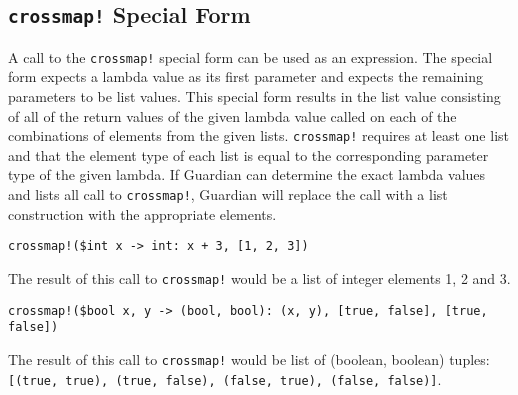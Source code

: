 
\subsection{\texttt{crossmap!} Special Form}
{
	A call to the \texttt{crossmap!} special form can be used as an expression.
	The special form expects a lambda value as its
	first parameter and expects the remaining parameters to be list values.
	This special form results in the list value consisting
	of all of the return values of the given lambda value called on each of
	the combinations of elements from the given lists.
	\texttt{crossmap!} requires at least one list and that
	the element type of each list is equal to the corresponding parameter type
	of the given lambda.
	If Guardian can determine the exact lambda values and lists all call to
	\texttt{crossmap!}, Guardian will replace the call with a list
	construction with the appropriate elements.
	
	\begin{itemize}
	{
		\item \texttt{crossmap!(\$int x -> int: x + 3, [1, 2, 3])}
		
			The result of this call to \texttt{crossmap!} would be a list of
			integer elements 1, 2 and 3.
		
		\item \texttt{crossmap!(\$bool x, y -> (bool, bool): (x, y), [true, false], [true, false])}
		
			The result of this call to \texttt{crossmap!} would be list of
			(boolean, boolean)
			tuples: \texttt{[(true, true), (true, false), (false, true), (false, false)]}.
	}
	\end{itemize}
}
